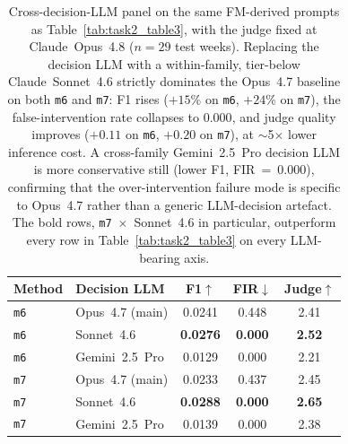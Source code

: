 \begin{table}[!htbp]
\centering\small
\setlength{\tabcolsep}{4pt}
\begin{tabular}{@{}llccc@{}}
\toprule
Method & Decision LLM & F1$\uparrow$ & FIR$\downarrow$ & Judge$\uparrow$ \\
\midrule
\texttt{m6} & Opus~4.7 (main)  & 0.0241 & 0.448 & 2.41 \\
\texttt{m6} & Sonnet~4.6       & \textbf{0.0276} & \textbf{0.000} & \textbf{2.52} \\
\texttt{m6} & Gemini~2.5~Pro   & 0.0129 & 0.000 & 2.21 \\
\midrule
\texttt{m7} & Opus~4.7 (main)  & 0.0233 & 0.437 & 2.45 \\
\texttt{m7} & Sonnet~4.6       & \textbf{0.0288} & \textbf{0.000} & \textbf{2.65} \\
\texttt{m7} & Gemini~2.5~Pro   & 0.0139 & 0.000 & 2.38 \\
\bottomrule
\end{tabular}
\caption{Cross-decision-LLM panel on the same FM-derived prompts as
Table~\ref{tab:task2_table3}, with the judge fixed at Claude~Opus~4.8
($n\!=\!29$ test weeks). Replacing the decision LLM with a
within-family, tier-below Claude~Sonnet~4.6 strictly dominates the
Opus~4.7 baseline on both \texttt{m6} and \texttt{m7}: F1 rises
($+15\%$ on \texttt{m6}, $+24\%$ on \texttt{m7}), the false-intervention
rate collapses to $0.000$, and judge quality improves
($+0.11$ on \texttt{m6}, $+0.20$ on \texttt{m7}), at $\sim$5$\times$
lower inference cost. A cross-family Gemini~2.5~Pro decision LLM
is more conservative still (lower F1, FIR~=~$0.000$), confirming
that the over-intervention failure mode is specific to Opus~4.7
rather than a generic LLM-decision artefact. The bold rows,
\texttt{m7}~$\times$~Sonnet~4.6 in particular, outperform every row
in Table~\ref{tab:task2_table3} on every LLM-bearing axis.}
\label{tab:decision_panel}
\end{table}
